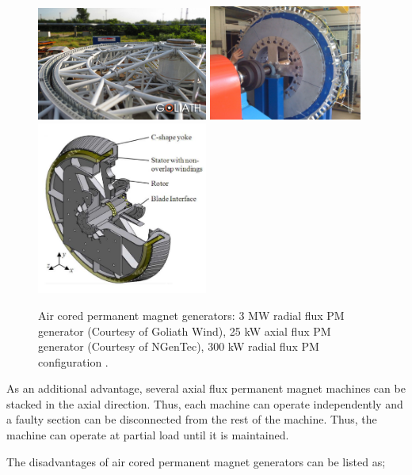 \documentclass[a4paper, 11pt]{article} %
\begin{document}
  \begin{figure}[t]
    \centering
    \includegraphics[width=0.5\textwidth]{goliath}
    \includegraphics[width=0.45\textwidth]{25kw_cgen}
    \includegraphics[width=0.5\textwidth]{c-core_kamper}
    \caption{Air cored permanent magnet generators: 3 MW radial flux PM generator (Courtesy of Goliath Wind), 25 kW axial flux PM generator (Courtesy of NGenTec), 300 kW radial flux PM configuration \cite{Wijk2010}.} 
    \label{air_cored}
  \end{figure}


As an additional advantage, several axial flux permanent magnet machines can be stacked in the axial direction. Thus, each machine can operate independently and a faulty section can be disconnected from the rest of the machine. Thus, the machine can operate at partial load until it is maintained. 

The disadvantages of air cored permanent magnet generators can be listed as;
\end{document}
